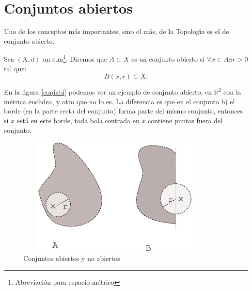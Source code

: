 \section{Conjuntos abiertos} Uno de los conceptos
m\'as importantes, sino el m\'as, de la Topolog\'{\i}a es el de
conjunto abierto.
\begin{definicion} Sea $(X,d)$ un e.m\footnote{Abreviaci\'on para espacio
m\'etrico}. Diremos que $A\subset X$ es un conjunto abierto si
$\forall x\in A\exists r>0$ tal que:
\[
	B(x,r)\subset X.
\]
\end{definicion}
En la figura \vref{conjabi} podemos ver un ejemplo de conjunto
abierto, en $\mathbb{R}^2$ con la m\'etrica euclidea, y otro que
no lo es. La diferencia es que en el conjunto b) el borde (en la
parte recta del conjunto) forma parte del mismo conjunto, entonces
si $x$ est\'a en este borde, toda bola centrada en $x$ contiene
puntos fuera del conjunto.
\begin{figure}
\begin{center}
	\includegraphics[height=6cm, width=10cm]{conjabi.eps}
	\caption{Conjuntos abiertos y no abiertos}\label{conjabi}
\end{center}
\end{figure}

